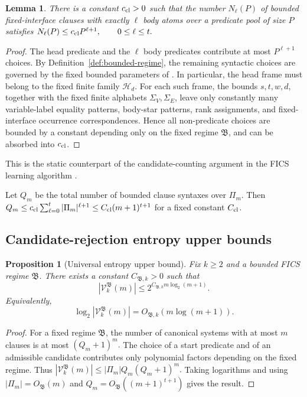 \documentclass[11pt]{article}
\newtheorem{proposition}[theorem]{Proposition}
\newtheorem{lemma}[theorem]{Lemma}
\theoremstyle{definition}
\theoremstyle{remark}
\begin{document}
\begin{lemma}
There is a constant \(c_{\rm cl}>0\) such that the number \(N_\ell(P)\) of
bounded fixed-interface clauses with exactly \(\ell\) body atoms over a
predicate pool of size \(P\) satisfies
\(N_\ell(P)\le c_{\rm cl}P^{\ell+1}, \qquad 0\le\ell\le t.\)
\end{lemma}

\begin{proof}
The head predicate and the \(\ell\) body predicates contribute at most
\(P^{\ell+1}\) choices.  By Definition~\ref{def:bounded-regime}, the remaining
syntactic choices are governed by the fixed bounded parameters of
\cite{ShoudaiEtAl2026}.  In particular, the head frame must belong to the
fixed finite family \(\mathcal H_d\).  For each such frame, the bounds
\(s,t,w,d\), together with the fixed finite alphabets \(\Sigma_V,\Sigma_E\),
leave only constantly many variable-label equality patterns, body-star
patterns, rank assignments, and fixed-interface occurrence correspondences.
Hence all non-predicate choices are bounded by a constant depending only on
the fixed regime \(\mathfrak B\), and can be absorbed into \(c_{\rm cl}\).
\end{proof}

This is the static counterpart of the candidate-counting argument in the
FICS learning algorithm \cite{ShoudaiEtAl2026}.

Let \(Q_m\) be the total number of bounded clause syntaxes over \(\Pi_m\).
Then
\(Q_m \le c_{\rm cl}\sum_{\ell=0}^{t}|\Pi_m|^{\ell+1} \le C_{\rm cl}(m+1)^{t+1}\)
for a fixed constant \(C_{\rm cl}\).

\subsection{Candidate-rejection entropy upper bounds}

\begin{proposition}[Universal entropy upper bound]
\label{prop:entropy-upper}
Fix \(k\ge2\) and a bounded FICS regime \(\mathfrak B\). There exists a
constant \(C_{\mathfrak B,k}>0\) such that
\[
|\mathcal V_k^{\mathfrak B}(m)|
\le
2^{C_{\mathfrak B,k}m\log_2(m+1)}.
\]
Equivalently,
\[
\log_2|\mathcal V_k^{\mathfrak B}(m)|
=
O_{\mathfrak B,k}(m\log(m+1)).
\]
\end{proposition}

\begin{proof}
For a fixed regime \(\mathfrak B\), the number of canonical systems with at
most \(m\) clauses is at most
\((Q_m+1)^m.\)
The choice of a start predicate and of an admissible candidate contributes
only polynomial factors depending on the fixed regime. Thus
\(|\mathcal V_k^{\mathfrak B}(m)| \le |\Pi_m|Q_m(Q_m+1)^m.\)
Taking logarithms and using \(|\Pi_m|=O_{\mathfrak B}(m)\) and
\(Q_m=O_{\mathfrak B}((m+1)^{t+1})\) gives the result.
\end{proof}
\end{document}
